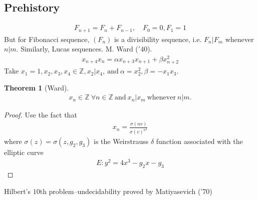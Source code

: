 \documentclass[12pt,reqno]{amsart}
\numberwithin{equation}{section}  %
\newcommand{\zz}{\mathbb{Z}}
\newtheorem{theorem}{Theorem}[section]
\begin{document}
\subsection{Prehistory} 
\label{ssec:prehistory}
%
%
\begin{equation*}
    \begin{split}
	F_{n+1} = F_{n} + F_{n-1}, \quad F_{0}=0, F_{1}=1
    \end{split}
\end{equation*}
%
%
But for Fibonacci sequence, $(F_{n})$ is a divisibility sequence, i.e.
$F_{n} \vert F_{m}$ whenever $n \vert m$. Similarly, Lucas sequences.
M. Ward ($'40$).
%
%
\begin{equation*}
    \begin{split}
	x_{n+4} x_{n} = \alpha x_{n+3}x_{n+1} + \beta x_{n+2}^{2}
    \end{split}
\end{equation*}
%
%
Take $x_{1} =1, x_{2},x_{3}, x_{4} \in \zz, x_{2} \vert x_{4}, \ \text{and} \
\alpha = x_{2}^{2}, \beta = -x_{1} x_{3}$. 
%
%
%
%
%
%
%
%
\begin{theorem}[Ward]
    \begin{equation*}
	\begin{split}
	    x_{n} \in \zz \ \forall n \in \zz \ \text{and} \ x_{n} \vert x_{m} \
	    \text{whenever} \ n \vert m.
	\end{split}
    \end{equation*}
    \label{thm:main}
\end{theorem}
%
%
\begin{proof}
    Use the fact that %
    \begin{equation*}
	\begin{split}
	    x_{n} = \frac{\sigma(nv)}{\sigma(v)^{n^{2}}}
	\end{split}
    \end{equation*}
    where $\sigma(z) = \sigma(z, g_{2}, g_{3})$ is the Weirstrauss $\delta$ function
    associated with the elliptic curve
    \begin{equation*}
	\begin{split}
	    E: y^{2}=4x^{3} - g_{2}x - g_{3}
	\end{split}
    \end{equation*}
\end{proof}
Hilbert's $10$th problem--undecidability proved by Matiyasevich ('70)
\end{document}
